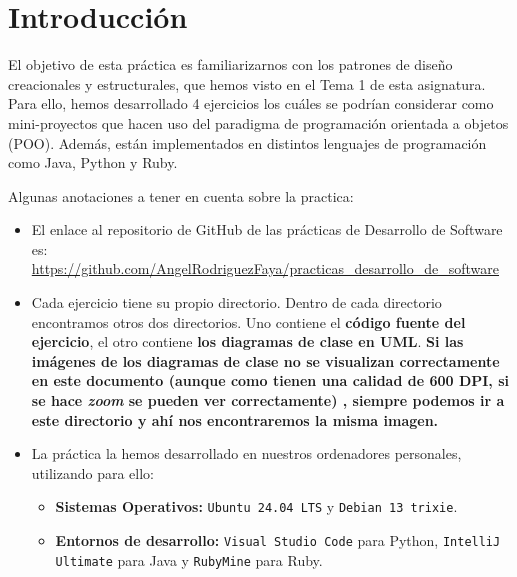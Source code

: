 \documentclass[a4paper,12pt]{article}
\begin{document}
	\tableofcontents
	\newpage %
	
	
	\setcounter{section}{-1}
	
	\section{Introducción}
		El objetivo de esta práctica es familiarizarnos con los patrones de diseño creacionales y estructurales, que hemos visto en el Tema 1 de esta asignatura. Para ello, hemos desarrollado 4 ejercicios los cuáles se podrían considerar como mini-proyectos que hacen uso del paradigma de programación orientada a objetos (POO). Además, están implementados en distintos lenguajes de programación como Java, Python y Ruby. \newline
		
		Algunas anotaciones a tener en cuenta sobre la practica:
		
		\begin{itemize}
			\item El enlace al repositorio de GitHub de las prácticas de Desarrollo de Software es: \url{https://github.com/AngelRodriguezFaya/practicas_desarrollo_de_software} 
			
			\item Cada ejercicio tiene su propio directorio. Dentro de cada directorio encontramos otros dos directorios. Uno contiene el \textbf{código fuente del ejercicio}, el otro contiene \textbf{los diagramas de clase en UML}. \textbf{Si las imágenes de los diagramas de clase no se visualizan correctamente en este documento (aunque como tienen una calidad de 600 DPI, si se hace \textit{zoom} se pueden ver correctamente) , siempre podemos ir a este directorio y ahí nos encontraremos la misma imagen.}
			
			\item La práctica la hemos desarrollado en nuestros ordenadores personales, utilizando para ello:
				\begin{itemize}
					\item \textbf{Sistemas Operativos:} \texttt{Ubuntu 24.04 LTS} y \texttt{Debian 13 trixie}.
					
					\item \textbf{Entornos de desarrollo: } \texttt{Visual Studio Code} para Python, \texttt{IntelliJ Ultimate} para Java y \texttt{RubyMine} para Ruby.
				\end{itemize}
		\end{itemize}
		
\end{document}
